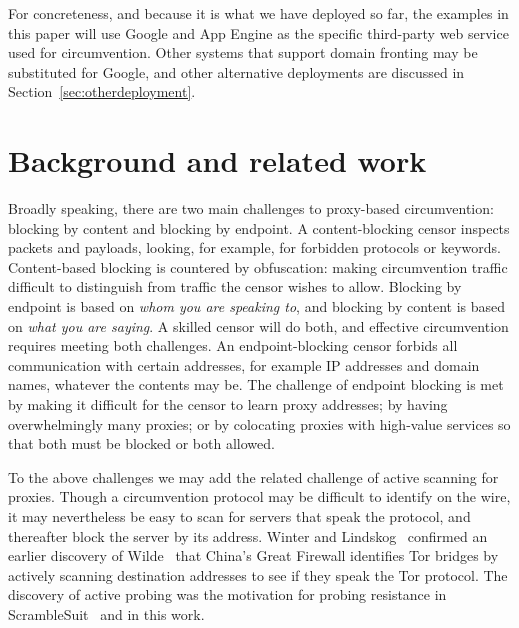 \documentclass{article}
\begin{document}
For concreteness, and because it is what we have deployed so far,
the examples in this paper will use Google and App Engine as the specific
third-party web service used for circumvention.
Other systems that support domain fronting may be substituted for Google,
and other alternative deployments are discussed in Section~\ref{sec:otherdeployment}.

\section{Background and related work}


Broadly speaking, there are two main challenges to proxy-based circumvention:
blocking by content and blocking by endpoint.
A content-blocking censor inspects packets and payloads,
looking, for example, for forbidden protocols or keywords.
Content-based blocking is countered by obfuscation:
making circumvention traffic difficult to distinguish
from traffic the censor wishes to allow.
Blocking by endpoint is based on \emph{whom you are speaking to},
and blocking by content is based on \emph{what you are saying}.
A skilled censor will do both, and effective circumvention requires meeting both challenges.
An endpoint-blocking censor forbids all communication with certain
addresses, for example IP addresses and domain names, whatever the contents may be.
The challenge of endpoint blocking is met by making it difficult for the censor to learn proxy addresses;
by having overwhelmingly many proxies;
or by colocating proxies with high-value services so that both must be blocked or both allowed.

To the above challenges we may add the related challenge of active scanning for proxies.
Though a circumvention protocol may be difficult to identify on the wire,
it may nevertheless be easy to scan for servers that speak the protocol,
and thereafter block the server by its address.
Winter and Lindskog~\cite{foci12-winter} confirmed an earlier discovery of
Wilde~\cite{wilde} that China's Great Firewall identifies Tor bridges
by actively scanning destination addresses to see if they speak the Tor protocol.
The discovery of active probing was the motivation for probing resistance in ScrambleSuit~\cite{scramblesuit}
and in this work.
\end{document}
